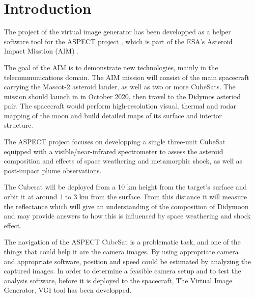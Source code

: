 \documentclass[english,12pt,a4paper,pdftex,elec,utf8]{aaltothesis}
\begin{document}
\cleardoublepage
\storeinipagenumber
{}
\setcounter{page}{1}


\section{Introduction}

The project of the virtual image generator has been developped as a helper software tool for the ASPECT project \cite{ASPECT}, which is part of the ESA's Asteroid Impact Misstion (AIM) \cite{AIM}.

The goal of the AIM is to demonstrate new technologies, mainly in the telecommunications domain. The AIM mission will consist of the main spacecraft carrying the Mascot-2 asteroid lander,  as well as two or more CubeSats. The mission should launch in in October 2020, then travel to the Didymos asteriod pair. The spacecraft would perform high-resolution visual, thermal and radar mapping of the moon and build detailed maps of its surface and interior structure. 

The ASPECT project focuses on developping a single three-unit CubeSat equipped with a visible/near-infrared spectrometer to assess the asteroid composition and effects of space weathering and metamorphic shock, as well as post-impact plume observations. 

The Cubesat will be deployed from a 10 km height from the target's surface and orbit it at around 1 to 3 km from the surface. From this distance it will measure the reflectance which will give an understanding of the composition of Didymoon and may provide answers to how this is influenced by space weathering and shock effect.

The navigation of the ASPECT CubeSat is a problematic task, and one of the things that could help it are the camera images. By using appropriate camera and appropriate software, position and speed could be estimated by analyzing the captured images. In order to determine a feasible camera setup and to test the analysis software, before it is deployed to the spacecraft, The Virtual Image Generator, VGI tool has been developped.
\end{document}
